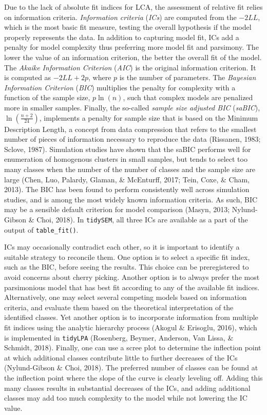 \documentclass[
  ,man,floatsintext]{apa6}
\begin{document}
Due to the lack of absolute fit indices for LCA, the assessment of relative fit
relies on information criteria.
\emph{Information criteria} (\emph{ICs}) are computed from the \(-2LL\),
which is the most basic fit measure, testing the overall hypothesis if the model properly represents the data.
In addition to capturing model fit, ICs add a penalty for model complexity thus
preferring more model fit and parsimony.
The lower the value of an information criterion, the better the overall fit of the
model.
The \emph{Akaike Information Criterion} (\emph{AIC}) is the original information criterion.
It is computed as \(-2LL+2p\), where \(p\) is the number of parameters.
The \emph{Bayesian Information Criterion} (\emph{BIC}) multiplies the penalty for complexity with a function of the sample size, \(p \ln(n)\),
such that complex models are penalized more in smaller samples.
Finally,
the so-called \emph{sample size adjusted BIC} (\emph{saBIC}), \(\ln(\frac{n + 2}{24})\),
implements a penalty for sample size that is based on the Minimum Description Length, a concept from data compression that refers to the smallest number of pieces of information necessary to reproduce the data (Rissanen, 1983; Sclove, 1987).
Simulation studies have shown that the saBIC performs well for enumeration of homogenous clusters in small samples,
but tends to select too many classes when the number of the number of classes and the sample size are large (Chen, Luo, Palardy, Glaman, \& McEnturff, 2017; Tein, Coxe, \& Cham, 2013).
The BIC has been found to perform consistently well across simulation studies,
and is among the most widely known information criteria.
As such, BIC may be a sensible default criterion for model comparison (Masyn, 2013; Nylund-Gibson \& Choi, 2018).
In \texttt{tidySEM}, all three ICs are available as a part of the output of \texttt{table\_fit()}.

ICs may occasionally contradict each other, so it is
important to identify a suitable strategy to reconcile them.
One option is to select a specific fit index, such as the BIC,
before seeing the results.
This choice can be preregistered to avoid concerns about cherry picking.
Another option is to always prefer the most parsimonious model that has best fit according to any of the available fit indices.
Alternatively, one may select several competing models based on information criteria,
and evaluate them based on the theoretical interpretation of the identified classes.
Yet another option is to incorporate information from multiple fit indices using the analytic hierarchy process (Akogul \& Erisoglu, 2016),
which is implemented in \texttt{tidyLPA} (Rosenberg, Beymer, Anderson, Van Lissa, \& Schmidt, 2018).
Finally, one can use a scree plot to determine the inflection point at which additional classes contribute little to further decreases of the ICs (Nylund-Gibson \& Choi, 2018).
The preferred number of classes can be found at the inflection point where the slope of the curve is clearly leveling off.
Adding this many classes results in substantial decreases of the ICs,
and adding additional classes may add too much complexity to the model while not lowering the IC value.
\end{document}
